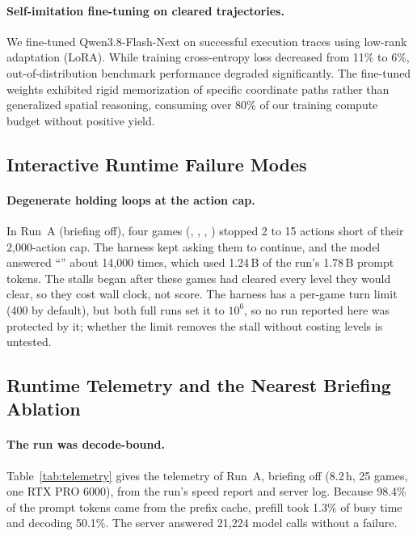 \paragraph{Self-imitation fine-tuning on cleared trajectories.}
We fine-tuned Qwen3.8-Flash-Next on successful execution traces using low-rank adaptation (LoRA). While training cross-entropy loss decreased from 11\% to 6\%, out-of-distribution benchmark performance degraded significantly. The fine-tuned weights exhibited rigid memorization of specific coordinate paths rather than generalized spatial reasoning, consuming over 80\% of our training compute budget without positive yield.

\subsection{Interactive Runtime Failure Modes}

\paragraph{Degenerate holding loops at the action cap.}
In Run~A (briefing off), four games (, , , ) stopped 2 to 15 actions short of their 2,000-action cap. The harness kept asking them to continue, and the model answered ``'' about 14,000 times, which used 1.24\,B of the run's 1.78\,B prompt tokens. The stalls began after these games had cleared every level they would clear, so they cost wall clock, not score. The harness has a per-game turn limit (400 by default), but both full runs set it to $10^6$, so no run reported here was protected by it; whether the limit removes the stall without costing levels is untested.

\subsection{Runtime Telemetry and the Nearest Briefing Ablation}
\label{app:telemetry}

\paragraph{The run was decode-bound.}
Table~\ref{tab:telemetry} gives the telemetry of Run~A, briefing off (8.2\,h, 25 games, one RTX PRO 6000), from the run's speed report and server log. Because 98.4\% of the prompt tokens came from the prefix cache, prefill took 1.3\% of busy time and decoding 50.1\%. The server answered 21,224 model calls without a failure.

